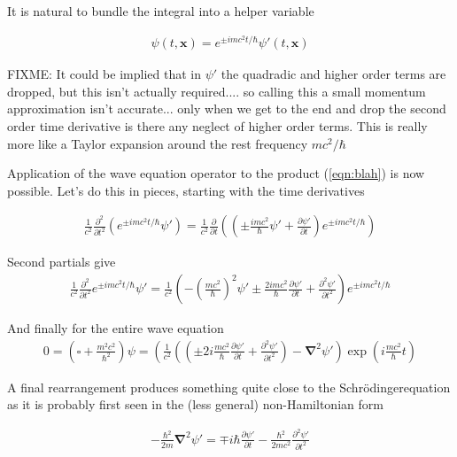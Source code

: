 \documentclass[]{eliblog}
\newcommand{\Bx}[0]{\mathbf{x}}
\newcommand{\spacegrad}[0]{\boldsymbol{\nabla}}
\newcommand{\delambertian}[0]{\square}
\newcommand{\inv}[1]{\frac{1}{#1}}
\newcommand{\Schrodinger}[0]{Schr\"{o}dinger}
\begin{document}
It is natural to bundle the integral into a helper variable

\begin{align}\label{eqn:blah}
{\psi}(t,\Bx) = e^{\pm im c^2 t /\hbar} \psi'(t,\Bx)
\end{align}

FIXME: It could be implied that in $\psi'$ the quadradic and higher order terms are dropped, but this isn't actually required.... so calling this
a small momentum approximation isn't accurate... only when we get to the end and drop the second order time derivative is there any 
neglect of higher order terms.  This is really more like a Taylor expansion around the rest frequency $m c^2/\hbar$

Application of the wave equation operator to the product (\ref{eqn:blah}) is now possible.  Let's do this in pieces, starting with the 
time derivatives

\begin{align}
\inv{c^2}\frac{\partial^2}{\partial t^2} \left( e^{\pm im c^2 t /\hbar} \psi' \right)
=
\inv{c^2}\frac{\partial}{\partial t} 
\left( \left( \pm \frac{i m c^2}{\hbar} \psi' + \frac{\partial \psi'}{\partial t} \right) e^{\pm im c^2 t /\hbar} \right)
\end{align}

Second partials give
\begin{align}
\inv{c^2}\frac{\partial^2}{\partial t^2} e^{\pm im c^2 t /\hbar} \psi'
=
\inv{c^2}
\left( - \left(\frac{m c^2}{\hbar}\right)^2 \psi' \pm \frac{2 i m c^2}{\hbar} \frac{\partial \psi'}{\partial t} + \frac{\partial^2 \psi'}{\partial t^2} \right) e^{\pm im c^2 t /\hbar} 
\end{align}

And finally for the entire wave equation
\begin{align}
0 = \left( \delambertian + \frac{m^2 c^2}{\hbar^2} \right) \psi
=
\left(
\frac{1}{c^2}
\left(
\left( 
\pm 2 i \frac{m c^2}{\hbar} \frac{\partial \psi'}{\partial t} +
\frac{\partial^2 \psi'}{\partial t^2}
\right)
-
\spacegrad^2 \psi'
\right)
\exp\left( i \frac{m c^2}{\hbar} t \right)
\end{align}

A final rearrangement produces something quite close to the \Schrodinger equation as it is probably first seen in the (less general) non-Hamiltonian form

\begin{align}
-\frac{\hbar^2}{2m} \spacegrad^2 \psi' = \mp i \hbar \frac{\partial \psi'}{\partial t} -\frac{\hbar^2}{2m c^2} \frac{\partial^2 \psi'}{\partial t^2}
\end{align}
\end{document}
